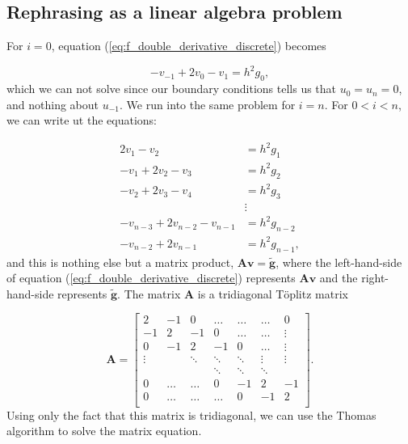 \documentclass{emulateapj}
\begin{document}
\subsection{Rephrasing as a linear algebra problem}

For \(i=0\), equation (\ref{eq:f_double_derivative_discrete}) becomes

\begin{equation*}
    -v_{-1} + 2v_{0} - v_{1} = h^{2} g_{0},
\end{equation*}
which we can not solve since our boundary conditions tells us that \(u_{0}=u_{n}=0\), and nothing about \(u_{-1}\). We run into the same problem for \(i=n\). For \(0 < i < n\), we can write ut the equations:

\begin{align*}
    2v_{1} - v_{2} &= h^{2} g_{1} \\
    -v_{1} + 2v_{2} - v_{3} &= h^{2} g_{2} \\
    -v_{2} + 2v_{3} - v_{4} &= h^{2} g_{3} \\
    &\vdots \\
    -v_{n-3} + 2v_{n-2} - v_{n-1} &= h^{2} g_{n-2} \\
    -v_{n-2} + 2v_{n-1} &= h^{2} g_{n-1},
\end{align*}
and this is nothing else but a matrix product, \(\textbf{A}\textbf{v} = \widetilde{\textbf{g}}\), where the left-hand-side of equation (\ref{eq:f_double_derivative_discrete}) represents \(\textbf{A}\textbf{v}\) and the right-hand-side represents \(\widetilde{\textbf{g}}\). The matrix \(\textbf{A}\) is a tridiagonal T\"oplitz matrix

\begin{equation}
\mathbf{A} = \begin{bmatrix}
                   2      & -1     & 0      & \ldots & \ldots & \ldots & 0      \\
                   -1     & 2      & -1     & 0      & \ldots & \ldots & \vdots \\
                   0      & -1     & 2      & -1     & 0      & \ldots & \vdots \\
                   \vdots &        & \ddots & \ddots & \ddots & \vdots & \vdots \\
                          &        &        & \ddots & \ddots & \ddots &        \\
                   0      & \ldots & \ldots & 0      & -1     & 2      & -1     \\
                   0      & \ldots & \ldots & \ldots & 0      & -1     & 2      \\
              \end{bmatrix}.
\end{equation}
Using only the fact that this matrix is tridiagonal, we can use the Thomas algorithm to solve the matrix equation.
\end{document}
